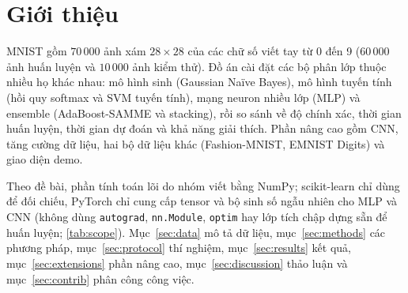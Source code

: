 \section{Giới thiệu}
\label{sec:intro}
MNIST \citep{lecun1998} gồm $70\,000$ ảnh xám $28\times28$ của các chữ số viết tay từ 0 đến 9 ($60\,000$ ảnh huấn luyện và $10\,000$ ảnh kiểm thử). Đồ án cài đặt các bộ phân lớp thuộc nhiều họ khác nhau: mô hình sinh (Gaussian Naïve Bayes), mô hình tuyến tính (hồi quy softmax và SVM tuyến tính), mạng neuron nhiều lớp (MLP) và ensemble (AdaBoost-SAMME và stacking), rồi so sánh về độ chính xác, thời gian huấn luyện, thời gian dự đoán và khả năng giải thích. Phần nâng cao gồm CNN, tăng cường dữ liệu, hai bộ dữ liệu khác (Fashion-MNIST, EMNIST Digits) và giao diện demo.

Theo đề bài, phần tính toán lõi do nhóm viết bằng NumPy; scikit-learn chỉ dùng để đối chiếu, PyTorch chỉ cung cấp tensor và bộ sinh số ngẫu nhiên cho MLP và CNN (không dùng \texttt{autograd}, \texttt{nn.Module}, \texttt{optim} hay lớp tích chập dựng sẵn để huấn luyện; \cref{tab:scope}). Mục~\ref{sec:data} mô tả dữ liệu, mục~\ref{sec:methods} các phương pháp, mục~\ref{sec:protocol} thí nghiệm, mục~\ref{sec:results} kết quả, mục~\ref{sec:extensions} phần nâng cao, mục~\ref{sec:discussion} thảo luận và mục~\ref{sec:contrib} phân công công việc.
